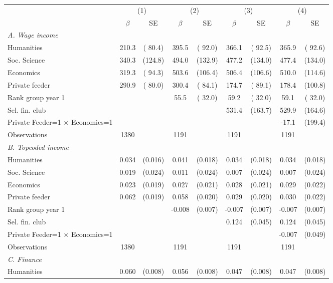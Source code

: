 \begin{tabular}{l*{8}{c}}
\toprule
& \multicolumn{2}{c}{(1)}& \multicolumn{2}{c}{(2)}& \multicolumn{2}{c}{(3)}& \multicolumn{2}{c}{(4)}\\
\cmidrule(lr){2-3}\cmidrule(lr){4-5}\cmidrule(lr){6-7}\cmidrule(lr){8-9}
& $\beta$ & SE& $\beta$ & SE& $\beta$ & SE& $\beta$ & SE\\
\midrule
\emph{A. Wage income} \\
Humanities &210.3& ( 80.4)&395.5& ( 92.0)&366.1& ( 92.5)&365.9& ( 92.6)\\
\addlinespace
Soc. Science &340.3& (124.8)&494.0& (132.9)&477.2& (134.0)&477.4& (134.0)\\
\addlinespace
Economics &319.3& ( 94.3)&503.6& (106.4)&506.4& (106.6)&510.0& (114.6)\\
\addlinespace
Private feeder &290.9& ( 80.0)&300.4& ( 84.1)&174.7& ( 89.1)&178.4& (100.8)\\
\addlinespace
Rank group year 1 &&& 55.5& ( 32.0)& 59.2& ( 32.0)& 59.1& ( 32.0)\\
\addlinespace
Sel. fin. club &&&&&531.4& (163.7)&529.9& (164.6)\\
\addlinespace
Private Feeder=1 $\times$ Economics=1 &&&&&&&-17.1& (199.4)\\
\addlinespace
\midrule
Observations&     1380&&     1191&&     1191&&     1191&\\
\midrule
\addlinespace
\emph{B. Topcoded income} \\
Humanities &0.034& (0.016)&0.041& (0.018)&0.034& (0.018)&0.034& (0.018)\\
\addlinespace
Soc. Science &0.019& (0.024)&0.011& (0.024)&0.007& (0.024)&0.007& (0.024)\\
\addlinespace
Economics &0.023& (0.019)&0.027& (0.021)&0.028& (0.021)&0.029& (0.022)\\
\addlinespace
Private feeder &0.062& (0.019)&0.058& (0.020)&0.029& (0.020)&0.030& (0.022)\\
\addlinespace
Rank group year 1 &&&-0.008& (0.007)&-0.007& (0.007)&-0.007& (0.007)\\
\addlinespace
Sel. fin. club &&&&&0.124& (0.045)&0.124& (0.045)\\
\addlinespace
Private Feeder=1 $\times$ Economics=1 &&&&&&&-0.007& (0.049)\\
\addlinespace
\midrule
Observations&     1380&&     1191&&     1191&&     1191&\\
\midrule
\addlinespace
\emph{C. Finance} \\
Humanities &0.060& (0.008)&0.056& (0.008)&0.047& (0.008)&0.047& (0.008)\\

\end{tabular}

